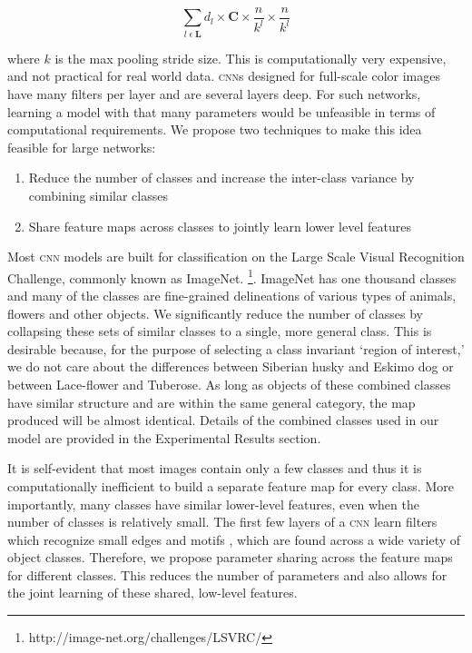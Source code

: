 \begin{equation*}
    \sum_{l \; \epsilon \; \mathbf{L}}{d_l \times \mathbf{C} \times \frac{n}{k^l} \times \frac{n}{k^l}}
\end{equation*}

where $k$ is the max pooling stride size.
This is computationally very expensive, and not practical for real world data.
\textsc{cnn}s designed for full-scale color images have many filters per layer and are several layers deep.
For such networks, learning a model with that many parameters would be unfeasible in terms of computational requirements.
We propose two techniques to make this idea feasible for large networks: 

\begin{enumerate}[i]
	 \item Reduce the number of classes and increase the inter-class variance by combining similar classes
    \item Share feature maps across classes to jointly learn lower level features
\end{enumerate}

Most \textsc{cnn} models are built for classification on the Large Scale Visual Recognition Challenge, commonly known as ImageNet.
\footnote{http://image-net.org/challenges/LSVRC/}.
ImageNet has one thousand classes and many of the classes are fine-grained delineations of various types of animals, flowers and other objects.
We significantly reduce the number of classes by collapsing these sets of similar classes to a single, more general class.
This is desirable because, for the purpose of selecting a class invariant `region of interest,' we do not care about the differences between Siberian husky and Eskimo dog or between Lace-flower and Tuberose.
As long as objects of these combined classes have similar structure and are within the same general category, the map produced will be almost identical.
Details of the combined classes used in our model are provided in the Experimental Results section.

It is self-evident that most images contain only a few classes and thus it is computationally inefficient to build a separate feature map for every class.
More importantly, many classes have similar lower-level features, even when the number of classes is relatively small.
The first few layers of a \textsc{cnn} learn filters which recognize small edges and motifs \cite{xxx_zeiler2014visualizing}, which are found across a wide variety of object classes.
Therefore, we propose parameter sharing across the feature maps for different classes.
This reduces the number of parameters and also allows for the joint learning of these shared, low-level features.

